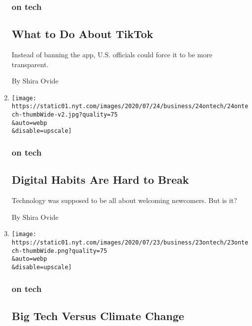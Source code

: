 \begin{enumerate}
  \hypertarget{on-tech-4}{%
  \subsubsection{on tech}\label{on-tech-4}}

  \hypertarget{what-to-do-about-tiktok}{%
  \subsection{What to Do About TikTok}\label{what-to-do-about-tiktok}}

  Instead of banning the app, U.S. officials could force it to be more
  transparent.

  By Shira Ovide
\item
  \href{/2020/07/24/technology/digital-habits.html}{}

  \texttt{[image: https://static01.nyt.com/images/2020/07/24/business/24ontech/24ontech-thumbWide-v2.jpg?quality=75\\\&auto=webp\\\&disable=upscale]}

  \hypertarget{on-tech-5}{%
  \subsubsection{on tech}\label{on-tech-5}}

  \hypertarget{digital-habits-are-hard-to-break}{%
  \subsection{Digital Habits Are Hard to
  Break}\label{digital-habits-are-hard-to-break}}

  Technology was supposed to be all about welcoming newcomers. But is
  it?

  By Shira Ovide
\item
  \href{/2020/07/23/technology/big-tech-climate-change.html}{}

  \texttt{[image: https://static01.nyt.com/images/2020/07/23/business/23ontech/23ontech-thumbWide.png?quality=75\\\&auto=webp\\\&disable=upscale]}

  \hypertarget{on-tech-6}{%
  \subsubsection{on tech}\label{on-tech-6}}

  \hypertarget{big-tech-versus-climate-change}{%
  \subsection{Big Tech Versus Climate
  Change}\label{big-tech-versus-climate-change}}


\end{enumerate}
